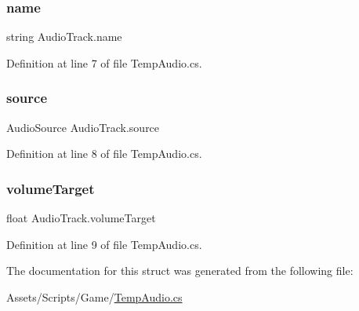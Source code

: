 \subsubsection{\texorpdfstring{name}{name}}
{\footnotesize\ttfamily string Audio\+Track.\+name}



Definition at line 7 of file Temp\+Audio.\+cs.

\mbox{\label{struct_audio_track_a43cc6e8e9debaca8d919a0b31fb600fc}} 
\subsubsection{\texorpdfstring{source}{source}}
{\footnotesize\ttfamily Audio\+Source Audio\+Track.\+source}



Definition at line 8 of file Temp\+Audio.\+cs.

\mbox{\label{struct_audio_track_a41be4ab8ce93a0555b7ac292bbb75cd0}} 
\subsubsection{\texorpdfstring{volume\+Target}{volumeTarget}}
{\footnotesize\ttfamily float Audio\+Track.\+volume\+Target}



Definition at line 9 of file Temp\+Audio.\+cs.



The documentation for this struct was generated from the following file\+:\begin{DoxyCompactItemize}
\item 
Assets/\+Scripts/\+Game/\mbox{\hyperlink{_temp_audio_8cs}{Temp\+Audio.\+cs}}\end{DoxyCompactItemize}
